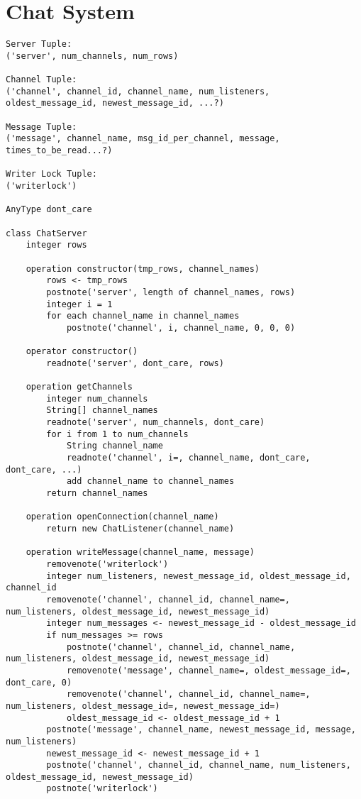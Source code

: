 \documentclass[10pt,a4paper]{article}
\begin{document}
\section{Chat System}
\begin{verbatim}
Server Tuple:
('server', num_channels, num_rows)

Channel Tuple:
('channel', channel_id, channel_name, num_listeners, oldest_message_id, newest_message_id, ...?)

Message Tuple:
('message', channel_name, msg_id_per_channel, message, times_to_be_read...?)

Writer Lock Tuple:
('writerlock')

AnyType dont_care

class ChatServer
	integer rows

	operation constructor(tmp_rows, channel_names)
		rows <- tmp_rows
		postnote('server', length of channel_names, rows)
		integer i = 1
		for each channel_name in channel_names
			postnote('channel', i, channel_name, 0, 0, 0)

	operator constructor()
		readnote('server', dont_care, rows)

	operation getChannels
		integer num_channels
		String[] channel_names
		readnote('server', num_channels, dont_care)
		for i from 1 to num_channels
			String channel_name
			readnote('channel', i=, channel_name, dont_care, dont_care, ...)
			add channel_name to channel_names
		return channel_names

	operation openConnection(channel_name)
		return new ChatListener(channel_name)

	operation writeMessage(channel_name, message)
		removenote('writerlock')
		integer num_listeners, newest_message_id, oldest_message_id, channel_id
		removenote('channel', channel_id, channel_name=, num_listeners, oldest_message_id, newest_message_id)
		integer num_messages <- newest_message_id - oldest_message_id
		if num_messages >= rows
			postnote('channel', channel_id, channel_name, num_listeners, oldest_message_id, newest_message_id)
			removenote('message', channel_name=, oldest_message_id=, dont_care, 0)
			removenote('channel', channel_id, channel_name=, num_listeners, oldest_message_id=, newest_message_id=)
			oldest_message_id <- oldest_message_id + 1
		postnote('message', channel_name, newest_message_id, message, num_listeners)
		newest_message_id <- newest_message_id + 1
		postnote('channel', channel_id, channel_name, num_listeners, oldest_message_id, newest_message_id)
		postnote('writerlock')
\end{verbatim}
\end{document}
